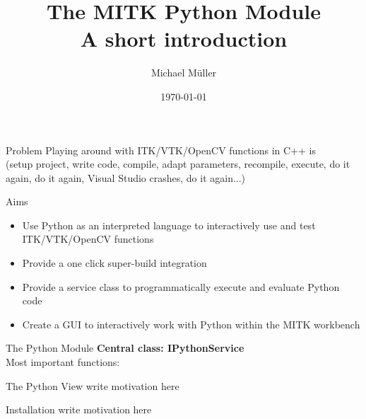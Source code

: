 \documentclass{beamer}
\title[The MITK Python Module]{The MITK Python Module\\A short introduction}
\author{Michael Müller}
\institute{mitk.org}
\date{\today}
\begin{document}
\begin{frame}
\titlepage
\end{frame}

\begin{frame}{Problem}
Playing around with ITK/VTK/OpenCV functions in C++ is
\\(setup project, write code, compile, adapt parameters, recompile, execute, do it again, do it again, Visual Studio crashes, do it again...)
\end{frame}

\begin{frame}{Aims}
\begin{itemize}
\item Use Python as an interpreted language to interactively use and test ITK/VTK/OpenCV functions \pause
\item Provide a one click super-build integration \pause
\item Provide a service class to programmatically execute and evaluate Python code \pause
\item Create a GUI to interactively work with Python within the MITK workbench
\end{itemize}
\end{frame}

\begin{frame}{The Python Module}
\textbf{Central class: IPythonService}\\
Most important functions:\\

\end{frame}

\begin{frame}{The Python View}
write motivation here
\end{frame}

\begin{frame}{Installation}
write motivation here
\end{frame}
\end{document}
